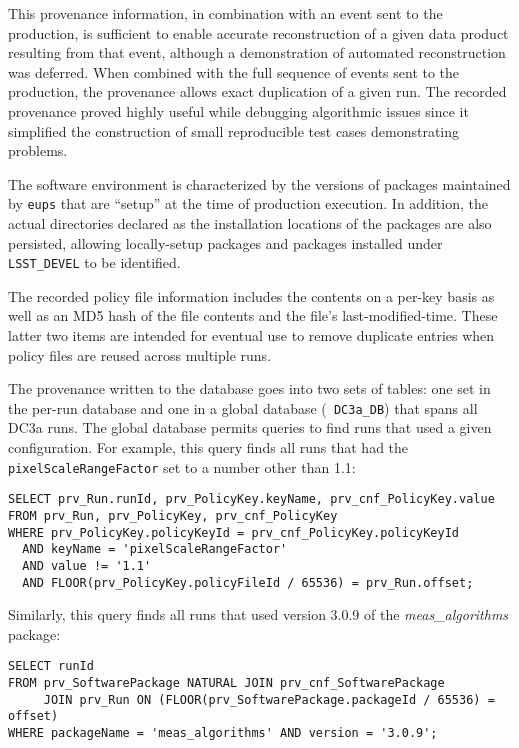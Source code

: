 This provenance information, in combination with an event sent to the
production, is sufficient to enable accurate reconstruction of a given
data product resulting from that event, although a demonstration of
automated reconstruction was deferred.  When combined with the full
sequence of events sent to the production, the provenance allows exact
duplication of a given run.  The recorded provenance proved highly
useful while debugging algorithmic issues since it simplified the
construction of small reproducible test cases demonstrating problems.

The software environment is characterized by the versions of packages
maintained by {\tt eups} that are ``setup'' at the time of production
execution.  In addition, the actual directories declared as the
installation locations of the packages are also persisted, allowing
locally-setup packages and packages installed under {\tt LSST\_DEVEL} to
be identified.

The recorded policy file information includes the contents on a per-key
basis as well as an MD5 hash of the file contents and the file's
last-modified-time.  These latter two items are intended for eventual
use to remove duplicate entries when policy files are reused across
multiple runs.

The provenance written to the database goes into two sets of tables: one
set in the per-run database and one in a global database ({\tt
DC3a\_DB}) that spans all DC3a runs.  The global database permits
queries to find runs that used a given configuration.  For example, this
query finds all runs that had the {\tt pixelScaleRangeFactor} set to a
number other than 1.1:

\begin{verbatim}
SELECT prv_Run.runId, prv_PolicyKey.keyName, prv_cnf_PolicyKey.value
FROM prv_Run, prv_PolicyKey, prv_cnf_PolicyKey
WHERE prv_PolicyKey.policyKeyId = prv_cnf_PolicyKey.policyKeyId
  AND keyName = 'pixelScaleRangeFactor'
  AND value != '1.1'
  AND FLOOR(prv_PolicyKey.policyFileId / 65536) = prv_Run.offset;
\end{verbatim}

Similarly, this query finds all runs that used version 3.0.9 of the {\it
meas\_algorithms} package:

\begin{verbatim}
SELECT runId
FROM prv_SoftwarePackage NATURAL JOIN prv_cnf_SoftwarePackage
     JOIN prv_Run ON (FLOOR(prv_SoftwarePackage.packageId / 65536) = offset)
WHERE packageName = 'meas_algorithms' AND version = '3.0.9';
\end{verbatim}

